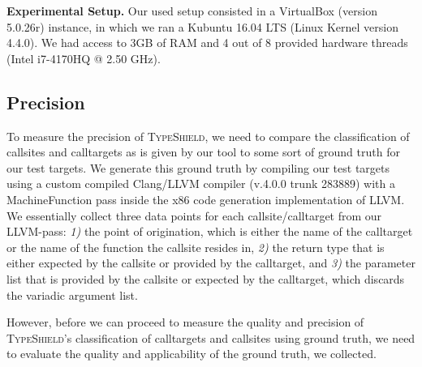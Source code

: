 \textbf{Experimental Setup.} Our used setup consisted in a VirtualBox (version 5.0.26r) instance, in which we ran a Kubuntu 16.04 LTS (Linux Kernel
version 4.4.0). We had access to 3GB of RAM and 4 out of 8 provided hardware threads (Intel i7-4170HQ @ 2.50 GHz).

\subsection{Precision}
\label{section:typeshieldprecision}

To measure the precision of \textsc{TypeShield}, we need to compare the classification of callsites and calltargets as is given by our tool to some sort of ground 
truth for our test targets. We generate this ground truth by compiling our test targets using a 
custom compiled Clang/LLVM compiler (v.4.0.0 trunk 283889) with a MachineFunction pass inside the x86 code generation implementation of LLVM. We essentially collect
three data points for each callsite/calltarget from our LLVM-pass:
\textit{1)} the point of origination, which is either the name of the calltarget or the name of the function the callsite resides in, 
\textit{2)} the return type that is either expected by the callsite or provided by the calltarget, and 
\textit{3)} the parameter list that is provided by the callsite or expected by the calltarget, which discards the variadic argument list.

However, before we can proceed to measure the quality and precision of \textsc{TypeShield}'s classification of calltargets and callsites using ground truth, we 
need to evaluate the quality and applicability of the ground truth, we collected.

